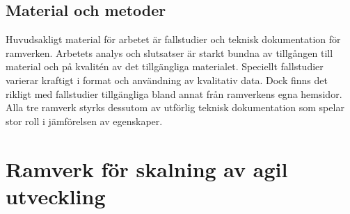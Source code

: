 	\subsection{Material och metoder}
		
		Huvudsakligt material för arbetet är fallstudier och teknisk dokumentation för ramverken. Arbetets analys och slutsatser är starkt bundna av tillgången till material och på kvalitén av det tillgängliga materialet. Speciellt fallstudier varierar kraftigt i format och användning av kvalitativ data. Dock finns det rikligt med fallstudier tillgängliga bland annat från ramverkens egna hemsidor. Alla tre ramverk styrks dessutom av utförlig teknisk dokumentation som spelar stor roll i jämförelsen av egenskaper.
				
		

	
	
		
	
	
	
	
\newpage
\section{Ramverk för skalning av agil utveckling}
	
